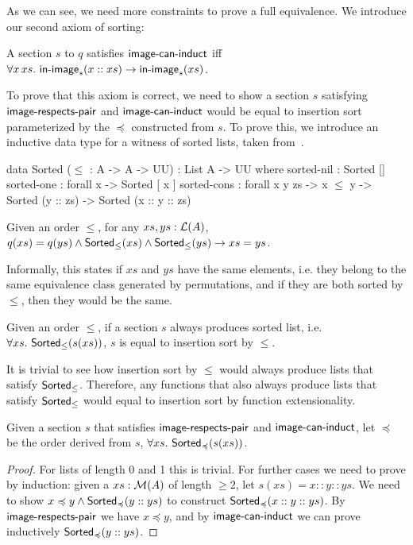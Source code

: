 As we can see, we need more constraints to prove a full equivalence.
We introduce our second axiom of sorting:
\begin{definition}
    A section $s$ to $q$ satisfies $\operatorname{\mathsf{image-can-induct}}$ iff
    $\forall x\,xs.\,\operatorname{\mathsf{in-image}}_s(x :: xs) \to \operatorname{\mathsf{in-image}}_s(xs)$.
\end{definition}

To prove that this axiom is correct, we need to show a section $s$ satisfying
$\operatorname{\mathsf{image-respects-pair}}$ and $\operatorname{\mathsf{image-can-induct}}$ would be equal to insertion sort parameterized by
the $\preccurlyeq$ constructed from $s$. To prove this, we introduce an inductive data type
for a witness of sorted lists, taken from~\cite{appelVerifiedFunctionalAlgorithms2023}.

\begin{code}
data Sorted ($\leq$ : A -> A -> UU) : List A -> UU where
  sorted-nil : Sorted []
  sorted-one : forall x -> Sorted [ x ]
  sorted-cons : forall x y zs -> x $\leq$ y -> Sorted (y :: zs) -> Sorted (x :: y :: zs)
\end{code}

\begin{proposition}
    Given an order $\leq$, for any $xs, ys : \mathcal{L}(A)$,
    $q(xs) = q(ys) \land \operatorname{\mathsf{Sorted}}_{\leq}(xs) \land \operatorname{\mathsf{Sorted}}_{\leq}(ys) \to xs = ys$.
\end{proposition}

Informally, this states if $xs$ and $ys$ have the same elements, i.e. they belong to the same
equivalence class generated by permutations, and if they are both sorted by $\leq$, then they would be the same.

\begin{corollary}\label{sort:sort-uniq}
    Given an order $\leq$,
    if a section $s$ always produces sorted list, i.e. $\forall xs.\,\operatorname{\mathsf{Sorted}}_{\leq}(s(xs))$,
    $s$ is equal to insertion sort by $\leq$.
\end{corollary}
It is trivial to see how insertion sort by $\leq$ would always produce lists that satisfy
$\operatorname{\mathsf{Sorted}}_{\leq}$. Therefore, any functions that also always produce lists that satisfy
$\operatorname{\mathsf{Sorted}}_{\leq}$ would equal to insertion sort by function extensionality.

\begin{corollary}\label{sort:well-behave-sorts}
    Given a section $s$ that satisfies $\operatorname{\mathsf{image-respects-pair}}$ and $\operatorname{\mathsf{image-can-induct}}$,
    let $\preccurlyeq$ be the order derived from $s$,
    $\forall xs.\,\operatorname{\mathsf{Sorted}}_{\preccurlyeq}(s(xs))$.
\end{corollary}
\begin{proof}
    For lists of length 0 and 1 this is trivial. For further cases we need to prove by induction:
    given a $xs : \mathcal{M}(A)$ of length $\geq 2$, let $s(xs) = x :: y :: ys$. We need to show
    $x \preccurlyeq y \land \operatorname{\mathsf{Sorted}}_{\preccurlyeq}(y :: ys)$ to construct
    $\operatorname{\mathsf{Sorted}}_{\preccurlyeq}(x :: y :: ys)$.
    By $\operatorname{\mathsf{image-respects-pair}}$ we have $x \preccurlyeq y$, and by $\operatorname{\mathsf{image-can-induct}}$ we can prove
    inductively $\operatorname{\mathsf{Sorted}}_{\preccurlyeq}(y :: ys)$.
\end{proof}

